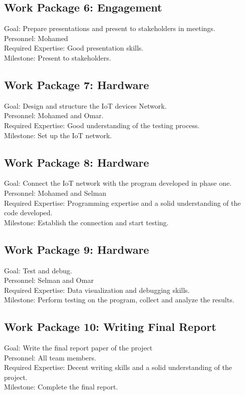 \documentclass{article}
\begin{document}
\subsection{Work Package 6: Engagement}
Goal: Prepare presentations and present to stakeholders in meetings.\\
Personnel: Mohamed\\
Required Expertise: Good presentation skills.\\
Milestone: Present to stakeholders.

\subsection{Work Package 7: Hardware}
Goal: Design and structure the IoT devices Network.\\
Personnel: Mohamed and Omar.\\
Required Expertise: Good understanding of the testing process.\\
Milestone: Set up the IoT network.

\subsection{Work Package 8: Hardware}
Goal: Connect the IoT network with the program developed in phase one.\\
Personnel: Mohamed and Selman\\
Required Expertise: Programming expertise and a solid understanding of the code developed.\\
Milestone: Establish the connection and start testing.

\subsection{Work Package 9: Hardware}
Goal: Test and debug.\\
Personnel: Selman and Omar\\
Required Expertise: Data visualization and debugging skills.\\
Milestone: Perform testing on the program, collect and analyze the results.

\subsection{Work Package 10: Writing Final Report}
Goal: Write the final report paper of the project\\
Personnel: All team members.\\
Required Expertise: Decent writing skills and a solid understanding of the project.\\
Milestone: Complete the final report.
\end{document}
